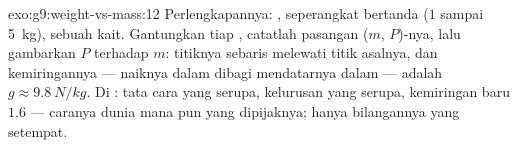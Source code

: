 \begin{solution}{exo:g9:weight-vs-mass:12}
Perlengkapannya: , seperangkat  bertanda ($1$ sampai
\qty{5}{kg}), sebuah kait. Gantungkan tiap , catatlah pasangan
($m$, $P$)-nya, lalu gambarkan $P$ terhadap $m$: titiknya sebaris
melewati titik asalnya, dan kemiringannya --- naiknya dalam 
dibagi mendatarnya dalam  --- adalah $g \approx \qty{9.8}{N/kg}$.
Di : tata cara yang serupa, kelurusan yang serupa, kemiringan
baru $1.6$ --- caranya  dunia mana pun yang dipijaknya; hanya
bilangannya yang setempat.
\end{solution}

